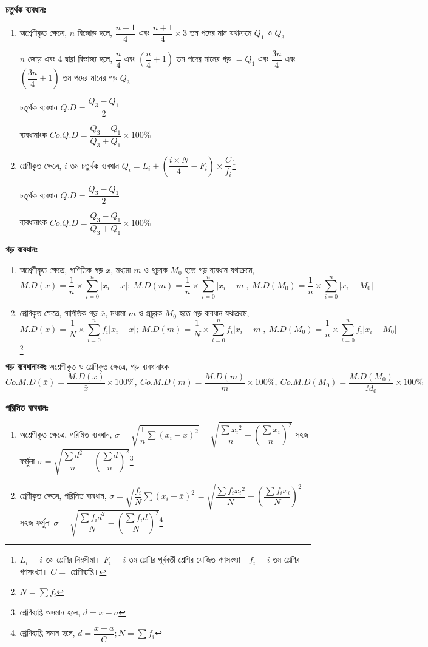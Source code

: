 \documentclass[a4paper,12pt]{article}
\newcommand{\dd}{\displaystyle}
\begin{document}
\textbf{চতুর্থক ব্যবধানঃ} 
    \begin{enumerate}
        \item অশ্রেণীকৃত ক্ষেত্রে, $n$ বিজোড় হলে, $\dfrac{n+1}{4}$ এবং $\dfrac{n+1}{4}\times3$ তম পদের মান যথাক্রমে $Q_1$ ও $Q_3$ 
        
        $n$ জোড় এবং $4$ দ্বারা বিভাজ্য হলে, $\dd \dfrac{n}{4}$ এবং $\left( \dfrac{n}{4}+1 \right)$ তম পদের মানের গড় $=Q_1$ এবং $\dfrac{3n}{4}$ এবং $\left( \dfrac{3n}{4}+1 \right)$ তম পদের মানের গড় $Q_3$
        
        চতুর্থক ব্যবধান $\dd Q.D = \dfrac{Q_3-Q_1}{2}$

        ব্যবধানাংক $\dd Co.Q.D = \dfrac{Q_3-Q_1}{Q_3+Q_1}\times 100\% $
        
        \item শ্রেণীকৃত ক্ষেত্রে, $i$ তম চতুর্থক ব্যবধান $\dd Q_i = L_i + \left( \dfrac{i\times N}{4}-F_i \right) \times \dfrac{C}{f_i}$\footnote{$L_i=i$ তম শ্রেণির নিম্নসীমা। $F_i=i$ তম শ্রেণির পূর্ববর্তী শ্রেণির যোজিত গণসংখ্যা। $f_i=i$ তম শ্রেণির গণসংখ্যা। $C=$ শ্রেণিব্যপ্তি।}
        
        চতুর্থক ব্যবধান $\dd Q.D = \dfrac{Q_3-Q_1}{2}$

        ব্যবধানাংক $\dd Co.Q.D = \dfrac{Q_3-Q_1}{Q_3+Q_1}\times 100\% $
    \end{enumerate}
\textbf{গড় ব্যবধানঃ} 
\begin{enumerate}
    \item অশ্রেণীকৃত ক্ষেত্রে, গাণিতিক গড় $\bar{x}$, মধ্যমা $m$ ও প্রচুরক $M_0$ হতে গড় ব্যবধান যথাক্রমে, \[ M.D(\bar{x})=\dfrac{1}{n}\times \sum_{i=0}^{n} |x_i-\bar{x}|; \ M.D(m) =\dfrac{1}{n} \times \sum_{i=0}^{n} |x_i-m|, \ M.D(M_0) =\dfrac{1}{n} \times \sum_{i=0}^{n} |x_i-M_0|  \]
    \item শ্রেণিকৃত ক্ষেত্রে, গাণিতিক গড় $\bar{x}$, মধ্যমা $m$ ও প্রচুরক $M_0$ হতে গড় ব্যবধান যথাক্রমে, \[ M.D(\bar{x})=\dfrac{1}{N}\times \sum_{i=0}^{n} f_i|x_i-\bar{x}|; \ M.D(m) =\dfrac{1}{N} \times \sum_{i=0}^{n} f_i|x_i-m|, \ M.D(M_0) =\dfrac{1}{n} \times \sum_{i=0}^{n}f_i |x_i-M_0|  \] \footnote{$\dd N= \sum  f_i $}
\end{enumerate}
\textbf{গড় ব্যবধানাংকঃ} অশ্রেণীকৃত ও শ্রেণিকৃত ক্ষেত্রে, গড় ব্যবধানাংক $Co.M.D(\bar{x})=\dfrac{M.D(\bar{x})}{\bar{x}}\times100\%, \ Co.M.D(m) = \dfrac{M.D(m)}{m}\times 100\% , \ Co.M.D(M_0) = \dfrac{M.D(M_0)}{M_0}\times 100 \%$

\textbf{পরিমিত ব্যবধানঃ} 
\begin{enumerate}
    \item অশ্রেণীকৃত ক্ষেত্রে, পরিমিত ব্যবধান, $\dd \sigma = \sqrt{\dfrac{1}{n} \sum (x_i-\bar{x})^2} = \sqrt{\dfrac{\sum {x_i}^2}{n}-\left(\dfrac{\sum x_i}{n} \right)^2}$ সহজ ফর্মুলা $\dd \sigma = \sqrt{\dfrac{\sum d^2}{n}-\left(\dfrac{\sum d}{n} \right)^2}$\footnote{শ্রেণিব্যপ্তি অসমান হলে, $d=x-a$}
    \item শ্রেণীকৃত ক্ষেত্রে, পরিমিত ব্যবধান, $\dd \sigma = \sqrt{\dfrac{f_i}{N} \sum (x_i-\bar{x})^2} = \sqrt{\dfrac{\sum f_i {x_i}^2}{N}-\left(\dfrac{\sum f_i x_i}{N} \right)^2}$ সহজ ফর্মুলা $\dd \sigma = \sqrt{\dfrac{\sum f_id^2}{N}-\left(\dfrac{\sum f_i d}{N} \right)^2}$\footnote{শ্রেণিব্যপ্তি সমান হলে, $d=\dfrac{x-a}{C}; N=\sum f_i$} 
\end{enumerate}
\end{document}

